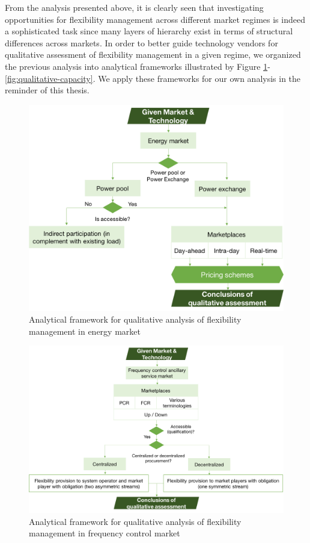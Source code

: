 From the analysis presented above, it is clearly seen that investigating opportunities for flexibility management across different market regimes is indeed a sophisticated task since many layers of hierarchy exist in terms of structural differences across markets. In order to better guide technology vendors for qualitative assessment of flexibility management in a given regime, we organized the previous analysis into analytical frameworks illustrated by Figure \ref{fig:qualitative-energy}-\ref{fig:qualitative-capacity}. We apply these frameworks for our own analysis in the reminder of this thesis.

\begin{figure}[h!]
	\centering
	\includegraphics[width=0.95\linewidth]{Figures/Q_energy}
	\caption{Analytical framework for qualitative analysis of flexibility management in energy market}
	\label{fig:qualitative-energy}
\end{figure}

\begin{figure}[h!]
	\centering
	\includegraphics[width=0.95\linewidth]{Figures/Q_frequency_control}
	\caption{Analytical framework for qualitative analysis of flexibility management in frequency control market}
	\label{fig:qualitative-fr}
\end{figure}

